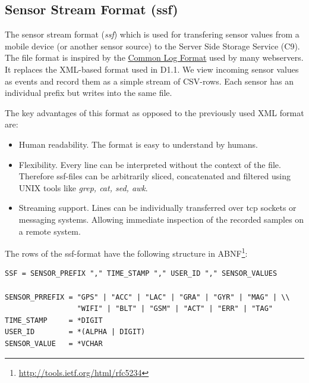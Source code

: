 \subsection{Sensor Stream Format (ssf)}\label{sec:ssf}
The sensor stream format ({\it ssf}) which is used for transfering
sensor values from a mobile device (or another sensor source) to the
Server Side Storage Service (C9). The file format is inspired by the
\href{http://en.wikipedia.org/wiki/Common\_Log\_Format}{Common Log
  Format} used by many webservers. It replaces the XML-based format
used in D1.1. We view incoming sensor values as events and record them
as a simple stream of CSV-rows. Each sensor has an individual prefix
but writes into the same file.

The key advantages of this format as opposed to the previously used
XML format are:
\begin{itemize}
\item Human readability. The format is easy to understand by humans.
\item Flexibility. Every line can be interpreted without the context
  of the file. Therefore ssf-files can be arbitrarily sliced,
  concatenated and filtered using UNIX tools like {\it grep, cat, sed,
    awk}.
\item Streaming support. Lines can be individually transferred over tcp
  sockets or messaging systems. Allowing immediate inspection of the
  recorded samples on a remote system.
\end{itemize}

The rows of the ssf-format have the following structure in ABNF\footnote{\url{http://tools.ietf.org/html/rfc5234}}:
\small
\begin{verbatim}
SSF = SENSOR_PREFIX "," TIME_STAMP "," USER_ID "," SENSOR_VALUES

SENSOR_PRREFIX = "GPS" | "ACC" | "LAC" | "GRA" | "GYR" | "MAG" | \\
                 "WIFI" | "BLT" | "GSM" | "ACT" | "ERR" | "TAG" 
TIME_STAMP     = *DIGIT
USER_ID        = *(ALPHA | DIGIT)
SENSOR_VALUE   = *VCHAR
\end{verbatim}
\normalsize

